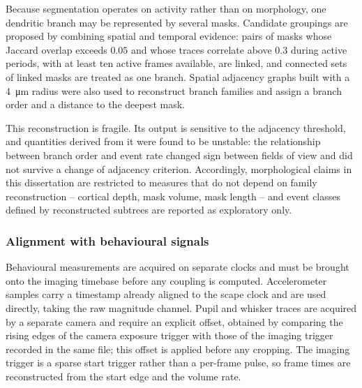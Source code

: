 			Because segmentation operates on activity rather than on morphology,
			one dendritic branch may be represented by several masks.
			Candidate groupings are proposed by combining spatial and temporal
			evidence: pairs of masks whose Jaccard overlap exceeds $0.05$ and
			whose traces correlate above $0.3$ during active periods, with at
			least ten active frames available, are linked, and connected sets of
			linked masks are treated as one branch.
			Spatial adjacency graphs built with a \SI{4}{\micro\meter} radius
			were also used to reconstruct branch families and assign a branch
			order and a distance to the deepest mask.

			This reconstruction is fragile.
			Its output is sensitive to the adjacency threshold, and quantities
			derived from it were found to be unstable: the relationship between
			branch order and event rate changed sign between fields of view and
			did not survive a change of adjacency criterion.
			Accordingly, morphological claims in this dissertation are restricted
			to measures that do not depend on family reconstruction -- cortical
			depth, mask volume, mask length -- and event classes defined by
			reconstructed subtrees are reported as exploratory only.


		\subsubsection{Alignment with behavioural signals}

			Behavioural measurements are acquired on separate clocks and must be
			brought onto the imaging timebase before any coupling is computed.
			Accelerometer samples carry a timestamp already aligned to the
			\acrshort{scape} clock and are used directly, taking the raw
			magnitude channel.
			Pupil and whisker traces are acquired by a separate camera and
			require an explicit offset, obtained by comparing the rising edges of
			the camera exposure trigger with those of the imaging trigger
			recorded in the same file; this offset is applied before any
			cropping. The imaging trigger is a sparse start trigger rather than a
			per-frame pulse, so frame times are reconstructed from the start edge
			and the volume rate.

